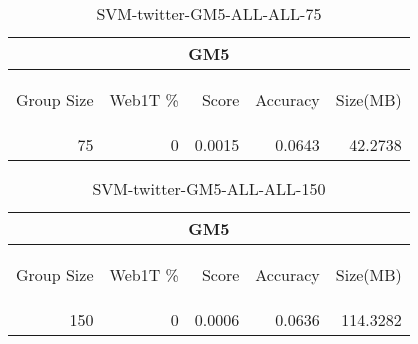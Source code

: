 \begin{center}
\begin{table}[htbp] 
 \begin{center}
\begin{tabular}{ | r | r | r | r | r |}
\hline
\multicolumn{5}{|c|}{GM5}\\
\hline
\begin{sideways}Group Size\end{sideways} & \begin{sideways}Web1T \%\end{sideways} & \begin{sideways}Score\end{sideways} & \begin{sideways}Accuracy\end{sideways} & \begin{sideways}Size(MB)\end{sideways}\\
\hline
\multirow{0}{*}{75}
 & 0 & 0.0015 & 0.0643 & 42.2738\\ \cline{2-5}
\hline
\end{tabular}
\caption{SVM-twitter-GM5-ALL-ALL-75}
\label{table:SVM-twitter-GM5-ALL-ALL-75}
\end{center}
 \end{table}
\end{center}

\begin{center}
\begin{table}[htbp] 
 \begin{center}
\begin{tabular}{ | r | r | r | r | r |}
\hline
\multicolumn{5}{|c|}{GM5}\\
\hline
\begin{sideways}Group Size\end{sideways} & \begin{sideways}Web1T \%\end{sideways} & \begin{sideways}Score\end{sideways} & \begin{sideways}Accuracy\end{sideways} & \begin{sideways}Size(MB)\end{sideways}\\
\hline
\multirow{0}{*}{150}
 & 0 & 0.0006 & 0.0636 & 114.3282\\ \cline{2-5}
\hline
\end{tabular}
\caption{SVM-twitter-GM5-ALL-ALL-150}
\label{table:SVM-twitter-GM5-ALL-ALL-150}
\end{center}
 \end{table}
\end{center}

